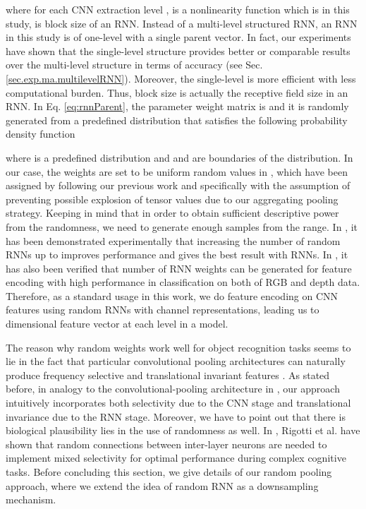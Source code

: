 \documentclass[10pt,journal,compsoc]{IEEEtran}
\begin{document}
where  for each CNN extraction level ,  is a nonlinearity function which is  in this study,  is block size of an RNN. Instead of a multi-level structured RNN, an RNN in this study is of one-level with a single parent vector. In fact, our experiments have shown that the single-level structure provides better or comparable results over the multi-level structure in terms of accuracy (see Sec. \ref{sec.exp.ma.multilevelRNN}). Moreover,  the single-level is more efficient with less computational burden. Thus,  block size is actually the receptive field size in an RNN. In Eq. \ref{eq:rnnParent}, the parameter weight matrix is  and it is randomly generated from a predefined distribution that satisfies the following probability density function

where  is a predefined distribution and  and  are boundaries of the distribution. In our case, the weights are set to be uniform random values in , which have been assigned by following our previous work \cite{Caglayan_ECCVW_2018} and specifically with the assumption of preventing possible explosion of tensor values due to our aggregating pooling strategy. Keeping in mind that in order to obtain sufficient descriptive power from the randomness, we need to generate enough samples from the range. In \cite{Socher_NIPS_2012}, it has been demonstrated experimentally that increasing the number of random RNNs up to  improves performance and gives the best result with  RNNs. In \cite{Caglayan_ECCVW_2018}, it has also been verified that  number of RNN weights can be generated for feature encoding with high performance in classification on both of RGB and depth data. Therefore, as a standard usage in this work, we do feature encoding on CNN features using  random RNNs with  channel representations, leading us to  dimensional feature vector at each level in a model.

The reason why random weights work well for object recognition tasks seems to lie in the fact that particular convolutional pooling architectures can naturally produce frequency selective and translational invariant features \cite{Saxe_ICML_2011}. As stated before, in analogy to the convolutional-pooling architecture in \cite{Jarrett_ICCV_2009}, our approach intuitively incorporates both selectivity due to the CNN stage and translational invariance due to the RNN stage. Moreover, we have to point out that there is biological plausibility lies in the use of randomness as well. In \cite{Rigotti_Frontiers_2010}, Rigotti et al. have shown that random connections between inter-layer neurons are needed to implement mixed selectivity for optimal performance during complex cognitive tasks. Before concluding this section, we give details of our random pooling approach, where we extend the idea of random RNN as a downsampling mechanism.
\end{document}
